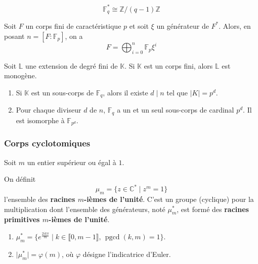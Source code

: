 	\begin{corollary}
		\[ \mathbb{F}_q^* \cong \mathbb{Z}/(q-1)\mathbb{Z} \]
	\end{corollary}

	\begin{proposition}
		Soit $F$ un corps fini de caractéristique $p$ et soit $\xi$ un générateur de $F^*$. Alors, en posant $n = [F:\mathbb{F}_p]$, on a
		\[ F = \bigoplus_{i=0}^n \mathbb{F}_p \xi^i \]
	\end{proposition}

	\begin{theorem}
		Soit $\mathbb{L}$ une extension de degré fini de $\mathbb{K}$. Si $\mathbb{K}$ est un corps fini, alors $\mathbb{L}$ est monogène.
	\end{theorem}


	\begin{theorem}
		\begin{enumerate}[label=(\roman*)]
			\item Si $\mathbb{K}$ est un sous-corps de $\mathbb{F}_q$, alors il existe $d \mid n$ tel que $\vert K \vert = p^d$.
			\item Pour chaque diviseur $d$ de $n$, $\mathbb{F}_q$ a un et un seul sous-corps de cardinal $p^d$. Il est isomorphe à $\mathbb{F}_{p^d}$.
		\end{enumerate}
	\end{theorem}

	\subsubsection{Corps cyclotomiques}

	Soit $m$ un entier supérieur ou égal à $1$.


	\begin{definition}
		On définit
		\[ \mu_m = \{ z \in \mathbb{C}^* \mid z^m = 1 \} \]
		l'ensemble des \textbf{racines $m$-ièmes de l'unité}. C'est un groupe (cyclique) pour la multiplication dont l'ensemble des générateurs, noté $\mu_m^*$, est formé des \textbf{racines primitives $m$-ièmes de l'unité}.
	\end{definition}

	\begin{proposition}
		\begin{enumerate}[label=(\roman*)]
			\item $\mu_m^* = \{ e^{\frac{2ik\pi}{m}} \mid k \in \llbracket 0, m-1 \rrbracket, \, \operatorname{pgcd}(k, m) = 1 \}$.
			\item $\vert \mu_m^* \vert = \varphi(m)$, où $\varphi$ désigne l'indicatrice d'Euler.
		\end{enumerate}
	\end{proposition}

